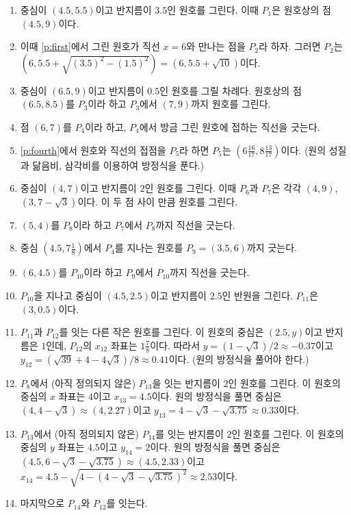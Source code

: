 \begin{enumerate}
\item  중심이 $(4.5, 5.5)$이고 반지름이 $3.5$인 원호를 그린다. 이때
  $P_1$은 원호상의 점 $(4.5, 9)$이다. \label{p:first}


\item 이때 \ref{p:first}에서 그린 원호가 직선 $x=6$와 만나는 점을
  $P_2$라 하자. 그러면 $P_2$는 $(6, 5.5+\sqrt{(3.5)^2 - (1.5)^2})= (6, 5.5+\sqrt{10})$이다.

\item 중심이 $(6.5, 9)$이고 반지름이 $0.5$인 원호를 그릴 차례다. 원호상의
   점 $(6.5, 8.5)$를 $P_3$이라 하고 $P_3$에서 $(7, 9)$까지 원호를 그린다. 

\item 점 $(6, 7)$를 $P_4$이라 하고, $P_4$에서 방금 그린 원호에 접하는
  직선을 긋는다.\label{p:fourth}

\item \ref{p:fourth}에서 원호와 직선의 접점을 $P_5$라 하면  $P_5$는
 $\left (6\frac{16}{17}, 8\frac{13}{17}\right )$이다. (원의 성질과
 닮음비, 삼각비를 이용하여 방정식을 푼다.)


\item 중심이 $(4, 7)$이고 반지름이 $2$인 원호를 그린다. 이때 $P_6$과
  $P_7$은 각각 $(4, 9)$, $(3, 7-\sqrt3)$이다. 이 두 점 사이 만큼
  원호를 그린다.

\item $(5, 4)$를 $P_8$이라 하고 $P_7$에서 $P_8$까지 직선을 긋는다.


\item 중심 $(4.5, 7\frac{1}{8})$에서 $P_4$를 지나는 원호를 $P_9 = (3.5,
  6)$까지 긋는다. 

\item $(6, 4.5)$를 $P_{10}$이라 하고 $P_9$에서 $P_{10}$까지 직선을
  긋는다.

\item $P_{10}$을 지나고 중심이 $(4.5, 2.5)$이고 반지름이 $2.5$인
  반원을 그린다. $P_{11}$은 $(3, 0.5)$이다.

\item $P_{11}$과 $P_{12}$를 잇는  다른 작은 원호를
 그린다. 이 원호의 중심은 $(2.5, y)$이고 반지름은
  $1$인데, $P_{12}$의 $x_{12}$ 좌표는 $1\frac78$이다. 따라서
 $y=(1-\sqrt3)/2 \approx -0.37$이고 $y_{12}=(\sqrt{39}+4-4\sqrt{3}) / 8
 \approx 0.41$이다. (원의 방정식을 풀어야 한다.) 

\item $P_8$에서 (아직 정의되지 않은) $P_{13}$을 잇는 반지름이 $2$인
  원호를 그린다. 이 원호의 중심의 $x$ 좌표는 $4$이고 $x_{13}=
  4.5$이다. 원의 방정식을 풀면 중심은 $(4, 4-\sqrt3) \approx (4,
  2.27)$이고 $y_{13}=4-\sqrt{3}-\sqrt{3.75} \approx 0.33$이다. 

\item $P_{13}$에서 (아직 정의되지 않은) $P_{14}$를 잇는 반지름이 $2$인
  원호를 그린다. 이 원호의 중심의 $y$ 좌표는 $4.5$이고 $y_{14}=
  2$이다. 원의 방정식을 풀면 중심은 $(4.5, 6-\sqrt3-\sqrt{3.75}) \approx (4.5,
  2.33)$이고 $x_{14}=4.5-\sqrt{4-(4-\sqrt{3}-\sqrt{3.75})^2} \approx
  2.53$이다. 

\item 마지막으로 $P_{14}$와 $P_{12}$를 잇는다. 
\end{enumerate}

